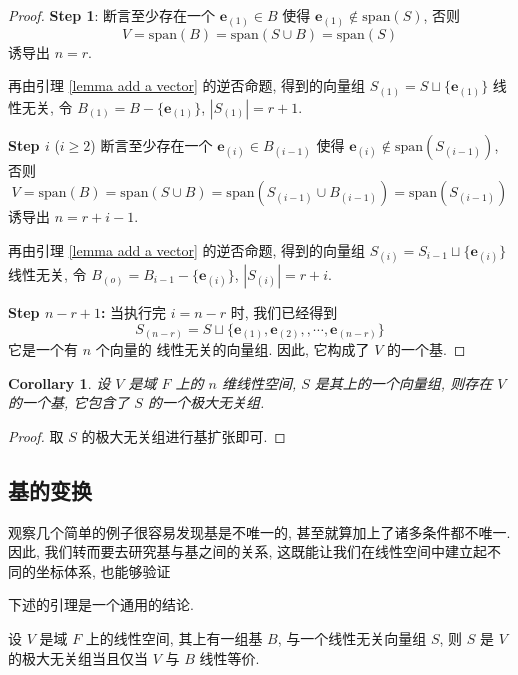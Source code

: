\documentclass[UTF8]{book}
\newtheorem{corollary}{Corollary}[section]
\begin{document}
\begin{proof}
    \textbf{Step 1}: 
    断言至少存在一个 
    $\boldsymbol{e}_{(1)} \in B$ 使得 
    $\boldsymbol{e}_{(1)} \notin \mathrm{span}(S)$, 
    否则 
    $$V = \mathrm{span}(B) =
    \mathrm{span}(S\cup B) = \mathrm{span}(S)$$ 
    诱导出 $n = r$.
    
    再由引理 \ref{lemma add a vector} 的逆否命题, 
    得到的向量组 $S_{(1)}= S\sqcup\{\boldsymbol{e}_{(1)}\}$ 
    线性无关, 令 $B_{(1)} = B -\{\boldsymbol{e}_{(1)}\}$, 
    $|S_{(1)}|=r+1$. 

    \textbf{Step $i$} ($i\geq 2$)
    断言至少存在一个 
    $\boldsymbol{e}_{(i)} \in B_{(i-1)}$ 使得 
    $\boldsymbol{e}_{(i)} \notin \mathrm{span}(S_{(i-1)})$, 
    否则 
    $$V = \mathrm{span}(B) =
    \mathrm{span}(S\cup B) = 
    \mathrm{span}(S_{(i-1)}\cup B_{(i-1)}) 
    = \mathrm{span}(S_{(i-1)})$$ 
    诱导出 $n = r+i-1$.
    
    再由引理 \ref{lemma add a vector} 的逆否命题, 
    得到的向量组 $S_{(i)}= S_{i-1}\sqcup\{\boldsymbol{e}_{(i)}\}$ 
    线性无关, 令 $B_{(o)} = B_{i-1} -\{\boldsymbol{e}_{(i)}\}$, 
    $|S_{(i)}|=r+i$. 

    \textbf{Step $n-r+1$:} 
    当执行完 $i = n-r$ 时, 我们已经得到 
    $$S_{(n-r)}=S\sqcup \{\boldsymbol{e}_{(1)},\boldsymbol{e}_{(2)},
    ,\cdots,\boldsymbol{e}_{(n-r)}\}$$ 它是一个有 $n$ 个向量的
    线性无关的向量组. 因此, 它构成了 $V$ 的一个基. 

\end{proof}

\begin{corollary}
    设 $V$ 是域 $F$ 上的 $n$ 维线性空间, 
    $S$ 是其上的一个向量组, 
    则存在 $V$ 的一个基, 它包含了 $S$ 的一个极大无关组. 
\end{corollary}

\begin{proof}
    取 $S$ 的极大无关组进行基扩张即可. 
\end{proof}


\subsection{基的变换}

观察几个简单的例子很容易发现基是不唯一的, 
甚至就算加上了诸多条件都不唯一. 
因此, 我们转而要去研究基与基之间的关系, 
这既能让我们在线性空间中建立起不同的坐标体系, 也能够验证

下述的引理是一个通用的结论. 

\begin{lemma}
    设 $V$ 是域 $F$ 上的线性空间, 其上有一组基 $B$, 
    与一个线性无关向量组 $S$, 
    则 $S$ 是 $V$ 的极大无关组当且仅当 $V$ 与 $B$ 线性等价.  
\end{lemma}
\end{document}

